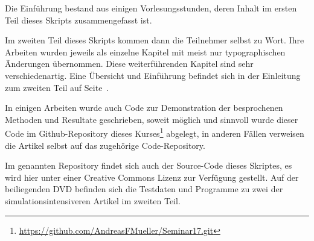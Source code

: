 Die Einführung bestand aus einigen Vorlesungsstunden, deren
Inhalt im ersten Teil dieses Skripts zusammengefasst ist.  

Im zweiten Teil dieses Skripts kommen dann die Teilnehmer selbst zu Wort.
Ihre Arbeiten wurden jeweils als einzelne
Kapitel mit meist nur typographischen Änderungen übernommen.
Diese weiterführenden Kapitel sind sehr verschiedenartig.
Eine Übersicht und Einführung befindet sich in der Einleitung
zum zweiten Teil auf Seite~\pageref{skript:uebersicht}.

In einigen Arbeiten wurde auch Code zur Demonstration der 
besprochenen Methoden und Resultate geschrieben, soweit
möglich und sinnvoll wurde dieser Code im Github-Repository
dieses Kurses\footnote{\url{https://github.com/AndreasFMueller/Seminar17.git}}
abgelegt, in anderen Fällen verweisen die Artikel selbst auf
das zugehörige Code-Repository.

Im genannten Repository findet sich auch der Source-Code dieses
Skriptes, es wird hier unter einer Creative Commons Lizenz
zur Verfügung gestellt.
Auf der beiliegenden DVD befinden sich die Testdaten und Programme
zu zwei der simulationsintensiveren Artikel im zweiten Teil.


